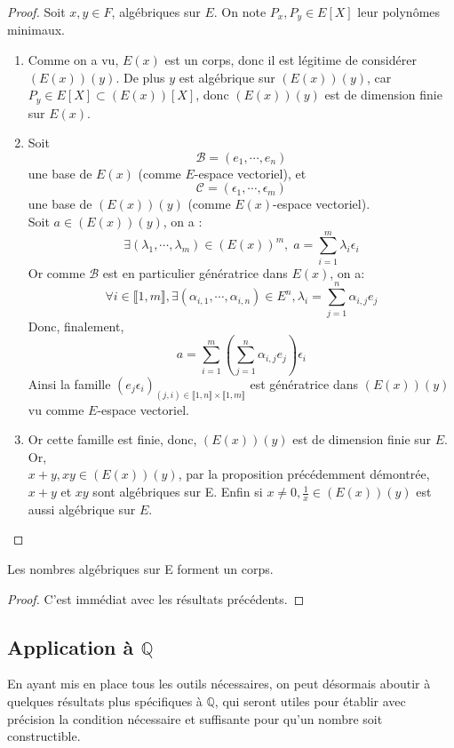 \documentclass[a4paper,12pt,french,draft]{report}
\begin{document}
		\begin{proof}
			Soit \(x,y \in F\), algébriques sur $E$. On note \(P_{x},P_{y} \in E[X]\) leur polynômes minimaux.
			\begin{enumerate}
				\item
				    Comme on a vu, $E(x)$ est un corps, donc il est légitime de considérer $(E(x))(y)$.
				    De plus $y$ est algébrique sur $(E(x))(y)$, car \(P_{y} \in E[X] \subset (E(x))[X]\), donc $(E(x))(y)$ est de dimension finie sur $E(x)$.
				\item 
				    Soit \[\mathcal{B} = (e_{1}, \cdots, e_{n}) \] une base de $E(x)$ (comme $E$-espace vectoriel), et \[\mathcal{C} = (\epsilon_{1},\cdots, \epsilon_{m})\] une base de $(E(x))(y)$ (comme $E(x)$-espace vectoriel).\\
				    Soit \(a \in (E(x))(y) \), on a : \[\exists (\lambda_{1},\cdots,\lambda_{m}) \in (E(x))^{m}, \; a = \sum_{i=1}^{m}\lambda_{i}\epsilon_{i}\]
				    Or comme $\mathcal{B}$ est en particulier génératrice dans $E(x)$, on a:
				    \[\forall i \in \llbracket 1 , m \rrbracket, \exists (\alpha_{i,1},\cdots,\alpha_{i,n}) \in E^{n}, \lambda_{i} = \sum_{j=1}^{n}\alpha_{i,j}e_{j} \]
				    Donc, finalement, 
				    \[a = \sum_{i=1}^{m} \left(  \sum_{j=1}^{n}\alpha_{i,j}e_{j} \right)\epsilon_{i} \]
				    Ainsi la famille \((e_{j}\epsilon_{i})_{(j,i) \in \llbracket 1 , n \rrbracket \times \llbracket 1 , m \rrbracket} \) est génératrice dans $(E(x))(y)$ vu comme {$E$-espace vectoriel}.
				\item{}
				    Or cette famille est finie, donc, $(E(x))(y)$ est de dimension finie sur $E$.  Or, \\\({x+y,xy \in (E(x))(y)}\), par la proposition précédemment démontrée, $x+y$ et $xy$ sont algébriques sur E. Enfin si $x \neq 0, \frac{1}{x} \in (E(x))(y)$ est aussi algébrique sur $E$.
			\end{enumerate}
		\end{proof}
		
		
		\begin{proposition}
			Les nombres algébriques sur E forment un corps.
		\end{proposition}
		\begin{proof}
		    C'est immédiat avec les résultats précédents.
		\end{proof}
	
		\subsection{Application à $\mathbb{Q}$}
	En ayant mis en place tous les outils nécessaires, on peut désormais aboutir à quelques résultats plus spécifiques à $\mathbb{Q}$, qui seront utiles pour établir avec précision la condition nécessaire et suffisante pour qu'un nombre soit constructible.
		
\end{document}
